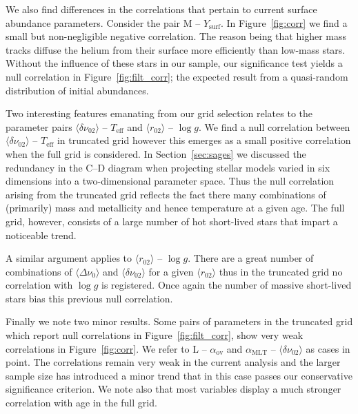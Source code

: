 We also find differences in the correlations that pertain to current surface abundance parameters. Consider the pair M -- $Y_{\text{surf}}$. In Figure~\ref{fig:corr} we find a small but non-negligible negative correlation. The reason being that higher mass tracks diffuse the helium from their surface more efficiently than low-mass stars.  Without the influence of these stars in our sample, our significance test yields a null correlation in Figure~\ref{fig:filt_corr}; the expected result from a quasi-random distribution of initial abundances. 

Two interesting features emanating from our grid selection relates to the parameter pairs ${\langle\delta\nu_{02}\rangle}$ -- $T_{\text{eff}}$ and ${\langle r_{02}\rangle}$ -- ${\log{} g}$. 
We find a null correlation  between ${\langle\delta\nu_{02}\rangle}$ -- $T_{\text{eff}}$ in truncated grid however this emerges as a small positive correlation when the full grid is considered. 
In Section~\ref{sec:sages} we discussed the redundancy in the C--D diagram when projecting stellar models varied in six dimensions into a two-dimensional parameter space.  Thus the  null correlation 
arising from the truncated grid reflects the fact there many combinations of (primarily) mass and metallicity and hence temperature at a given age.  
The full grid, however, consists of a large number of hot short-lived stars that impart a noticeable trend. 

A similar argument applies to ${\langle r_{02}\rangle}$ -- ${\log{} g}$. There are a great number of combinations of ${\langle\Delta\nu_0\rangle}$ and
${\langle\delta\nu_{02}\rangle}$ for a given ${\langle r_{02}\rangle}$ thus in the truncated grid no correlation with ${\log{} g}$ is registered. 
Once again the number of massive short-lived stars bias this previous null correlation. 


Finally we note two minor results. Some pairs of parameters in the truncated grid which report null correlations in  Figure~\ref{fig:filt_corr},  show very weak correlations in Figure~\ref{fig:corr}. 
We refer to  L -- $\alpha_{\text{ov}}$ and $\alpha_{\text{MLT}}$ -- ${\langle\delta\nu_{02}\rangle}$ as cases in point. The correlations remain very weak in the current analysis and the larger sample size has introduced a minor trend that in this case passes our conservative significance criterion. We note also that most variables display a much stronger correlation with age in the full grid. 
 






